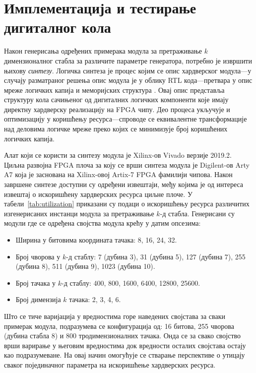 \documentclass[master]{finthesis}
\newcommand*{\kdim}[1]{\texorpdfstring{$k$\Hyphdash}{k-}димензионал#1}
\newcommand*{\kd}{\texorpdfstring{$k$}{k}-д }
\begin{document}

\section{Имплементација и тестирање дигиталног кола}

Након генерисања одређених примерака модула за претраживање \kdim{ног} стабла за различите параметре генератора, потребно је извршити њихову \emph{синтезу}. Логичка синтеза је процес којим се опис хардверског модула---у случају разматраног решења опис модула је у облику RTL кода---претвара у опис мреже логичких капија и меморијских структура \cite{stroud20091}. Овај опис представља структуру кола сачињеног од дигиталних логичких компоненти које имају директну хардверску реализацију на FPGA чипу. Део процеса укључује и оптимизацију у коришћењу ресурса---спроводе се еквивалентне трансформације над деловима логичке мреже преко којих се минимизује број коришћених логичких капија.

Алат који се користи за синтезу модула је Xilinx-ов Vivado верзије 2019.2. Циљна развојна FPGA плоча за коју се врши синтеза модула је Digilent-ов Arty A7 која је заснована на Xilinx-овој Artix-7 FPGA фамилији чипова. Након завршене синтезе доступни су одређени извештаји, међу којима је од интереса извештај о искоришћену хардверских ресурса циљне плоче. У табели~\ref{tab:utilization} приказани су подаци о искоришћењу ресурса различитих изгенерисаних инстанци модула за претраживање \kd стабла. Генерисани су модули где се одређена својства модула крећу у датим опсезима:
\begin{itemize}
    \item Ширина у битовима координата тачака: 8, 16, 24, 32.
    \item Број чворова у \kd стаблу: 7 (дубина 3), 31 (дубина 5), 127 (дубина 7), 255 (дубина 8), 511 (дубина 9), 1023 (дубина 10).
    \item Број тачака у \kd стаблу: 400, 800, 1600, 6400, 12800, 25600.
    \item Број димензија $k$ тачака: 2, 3, 4, 6.
\end{itemize}

Што се тиче варијација у вредностима горе наведених својстава за сваки примерак модула, подразумева се конфигурација од: 16 битова, 255 чворова (дубина стабла 8) и 800 тродимензионалних тачака. Онда се за свако својство врши варирање у његовим вредностима док вредности осталих својстава остају као подразумеване. На овај начин омогућује се стварање перспективе о утицају сваког појединачног параметра на искоришћење хардверских ресурса.
\end{document}
